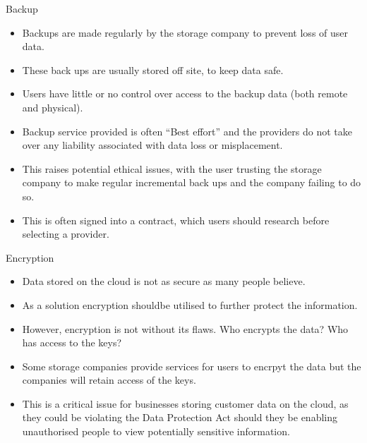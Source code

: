 \documentclass[final]{beamer}
\newlength{\onecolwid}
\newlength{\twocolwid}
\begin{document}
\begin{frame}[t]
\begin{columns}[t]
\begin{column}{\twocolwid}
\begin{columns}[t,totalwidth=\twocolwid]
\begin{column}{\onecolwid}\vspace{-.6in} %

\begin{block}{Backup}
\begin{itemize}
\item Backups are made regularly by the storage company to prevent loss of user data.
\item These back ups are usually stored off site, to keep data safe. 
\item Users have little or no control over access to the backup data (both remote and physical).
\item Backup service provided is often ``Best effort'' and the providers do not take over any liability associated with data loss or misplacement.
\item This raises potential ethical issues, with the user trusting the storage company to make regular incremental back ups and the company failing to do so.
\item This is often signed into a contract, which users should research before selecting a provider.
\end{itemize}
\end{block}

\begin{block}{Encryption}
\begin{itemize}
\item Data stored on the cloud is not as secure as many people believe.
\item As a solution encryption shouldbe utilised to further protect the information.
\item However, encryption is not without its flaws. Who encrypts the data? Who has access to the keys?
\item Some storage companies provide services for users to encrpyt the data but the companies will retain access of the keys\cite{good}.
\item This is a critical issue for businesses storing customer data on the cloud, as they could be violating the Data Protection Act should they be enabling unauthorised people to view potentially sensitive information.
\end{itemize}
\end{block}



\end{column}
\end{columns}
\end{column}
\end{columns}
\end{frame}
\end{document}
